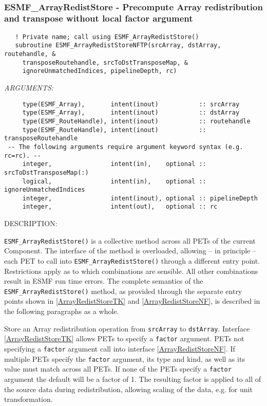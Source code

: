  
\mbox{}\hrulefill\ 
 
\subsubsection [ESMF\_ArrayRedistStore] {ESMF\_ArrayRedistStore - Precompute Array redistribution and transpose without local factor argument}


  
\begin{verbatim}   ! Private name; call using ESMF_ArrayRedistStore()
   subroutine ESMF_ArrayRedistStoreNFTP(srcArray, dstArray, routehandle, &
     transposeRoutehandle, srcToDstTransposeMap, &
     ignoreUnmatchedIndices, pipelineDepth, rc)\end{verbatim}{\em ARGUMENTS:}
\begin{verbatim}     type(ESMF_Array),       intent(inout)           :: srcArray
     type(ESMF_Array),       intent(inout)           :: dstArray
     type(ESMF_RouteHandle), intent(inout)           :: routehandle
     type(ESMF_RouteHandle), intent(inout)           :: transposeRoutehandle
 -- The following arguments require argument keyword syntax (e.g. rc=rc). --
     integer,                intent(in),    optional :: srcToDstTransposeMap(:)
     logical,                intent(in),    optional :: ignoreUnmatchedIndices
     integer,                intent(inout), optional :: pipelineDepth
     integer,                intent(out),   optional :: rc\end{verbatim}
{\sf DESCRIPTION:\\ }


   \label{ArrayRedistStoreNF}
   {\tt ESMF\_ArrayRedistStore()} is a collective method across all PETs of the
   current Component. The interface of the method is overloaded, allowing 
   -- in principle -- each PET to call into {\tt ESMF\_ArrayRedistStore()}
   through a different entry point. Restrictions apply as to which combinations
   are sensible. All other combinations result in ESMF run time errors. The
   complete semantics of the {\tt ESMF\_ArrayRedistStore()} method, as provided
   through the separate entry points shown in \ref{ArrayRedistStoreTK} and
   \ref{ArrayRedistStoreNF}, is described in the following paragraphs as a whole.
  
   Store an Array redistribution operation from {\tt srcArray} to {\tt dstArray}.
   Interface \ref{ArrayRedistStoreTK} allows PETs to specify a {\tt factor}
   argument. PETs not specifying a {\tt factor} argument call into interface
   \ref{ArrayRedistStoreNF}. If multiple PETs specify the {\tt factor} argument,
   its type and kind, as well as its value must match across all PETs. If none
   of the PETs specify a {\tt factor} argument the default will be a factor of
   1. The resulting factor is applied to all of the source data during
   redistribution, allowing scaling of the data, e.g. for unit transformation.
    
